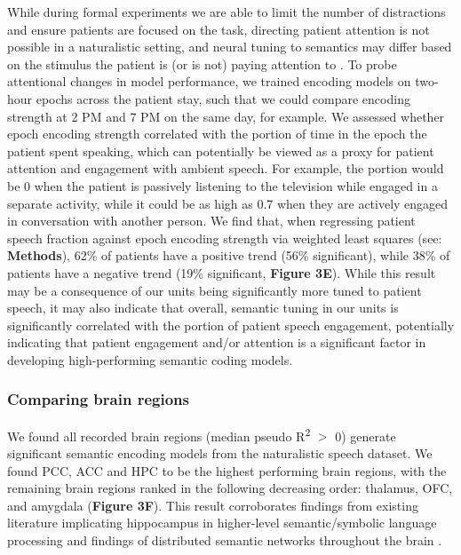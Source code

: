 \documentclass[pdflatex,sn-basic]{sn-jnl}%
\theoremstyle{thmstyleone}%
\theoremstyle{thmstyletwo}%
\theoremstyle{thmstylethree}%
\begin{document}
While during formal experiments we are able to limit the number of distractions and ensure patients are focused on the task, directing patient attention is not possible in a naturalistic setting, and neural tuning to semantics may differ based on the stimulus the patient is (or is not) paying attention to \citep{bib35}. To probe attentional changes in model performance, we trained encoding models on two-hour epochs across the patient stay, such that we could compare encoding strength at 2 PM and 7 PM on the same day, for example. We assessed whether epoch encoding strength correlated with the portion of time in the epoch the patient spent speaking, which can potentially be viewed as a proxy for patient attention and engagement with ambient speech. For example, the portion would be 0 when the patient is passively listening to the television while engaged in a separate activity, while it could be as high as 0.7 when they are actively engaged in conversation with another person. We find that, when regressing patient speech fraction against epoch encoding strength via weighted least squares (see: \textbf{Methods}), 62\% of patients have a positive trend (56\% significant), while 38\% of patients have a negative trend (19\% significant, \textbf{Figure 3E}). While this result may be a consequence of our units being significantly more tuned to patient speech, it may also indicate that overall, semantic tuning in our units is significantly correlated with the portion of patient speech engagement, potentially indicating that patient engagement and/or attention is a significant factor in developing high-performing semantic coding models.

\subsubsection{Comparing brain regions}

We found all recorded brain regions (median pseudo R\textsuperscript{{2}} $>$ 0) generate significant semantic encoding models from the naturalistic speech dataset. We found PCC, ACC and HPC to be the highest performing brain regions, with the remaining brain regions ranked in the following decreasing order: thalamus, OFC, and amygdala (\textbf{Figure 3F}). This result corroborates findings from existing literature implicating hippocampus in higher-level semantic/symbolic language processing and findings of distributed semantic networks throughout the brain \citep[e.g.,][]{bib2}.

\clearpage
\end{document}
